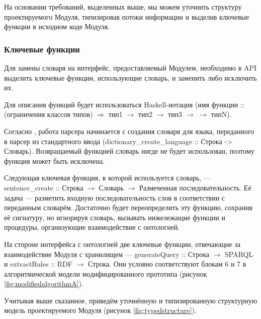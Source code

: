 На основании требований, выделенных выше, мы можем уточнить структуру проектируемого Модуля, типизировав потоки информации и выделив ключевые функции в исходном коде Модуля.

\subsubsection{Ключевые функции}

Для замены словаря на интерфейс, предоставляемый Модулем, необходимо в API выделить ключевые функции, использующие словарь, и заменить либо исключить их.

Для описания функций будет использоваться Haskell-нотация (имя функции :: (ограничения классов типов) \(\Rightarrow\) тип1 \(\rightarrow\) тип2 \(\rightarrow\) тип3 \(\rightarrow\) \textellipsis \(\rightarrow\) типN).

Согласно \cite{api}, работа парсера начинается с создания словаря для языка, переданного в парсер из стандартного ввода (dictionary_create_language :: Строка -> Словарь). Возвращаемый функцией словарь нигде не будет использован, поэтому функция может быть исключена.

Следующая ключевая функция, в которой используется словарь, --- sentence_create :: Строка \(\rightarrow\) Словарь \(\rightarrow\) Размеченная последовательность. Её задача --- разметить входную последовательность слов в соответствии с переданным словарём. Достаточно будет переопределить эту функцию, сохранив её сигнатуру, но игнорируя словарь, вызывать нижележащие функции и процедуры, организующие взаимодействие с онтологией.

На стороне интерфейса с онтологией две ключевые функции, отвечающие за взаимодействие Модуля с хранилищем --- generateQuery :: Строка \(\rightarrow\) SPARQL и extractRules :: RDF \(\rightarrow\) Строка. Они условно соответствуют блокам 6 и 7 в алгоритмической модели модифицированного прототипа (рисунок \ref{fig:modifiedalgorithmA}).

Учитывая выше сказанное, приведём уточнённую и типизированную структурную модель проектируемого Модуля (рисунок \ref{fig:typedstructure}).

